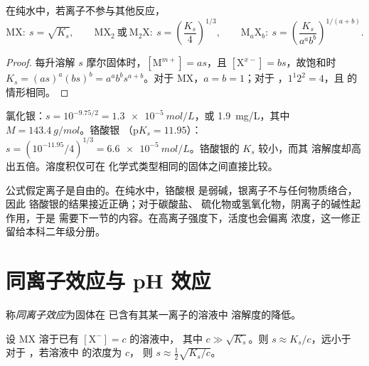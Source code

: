 \begin{proposition}[由溶度积求溶解度]\label{prop:b1:precipitation:s-of-ks}
在纯水中，若离子不参与其他反应，
\[
  \mathrm{MX}:\ s = \sqrt{K_s}, \qquad
  \mathrm{MX_2}\ \text{或}\ \mathrm{M_2X}:\ s = \left(\frac{K_s}{4}\right)^{1/3},
  \qquad
  \mathrm{M}_a\mathrm{X}_b:\ s = \left(\frac{K_s}{a^a b^b}\right)^{1/(a+b)} .
\]
\end{proposition}

\begin{proof}
每升溶解 $s$ 摩尔固体时，$[\mathrm{M}^{m+}] = as$，且
$[\mathrm{X}^{x-}] = bs$，故饱和时 $K_s = (as)^a(bs)^b =
a^a b^b s^{a+b}$。对于 MX，$a = b = 1$；对于 ，$1^1 2^2 = 4$，且
 的情形相同。
\end{proof}

\begin{example}[氯化银与铬酸银]\label{ex:b1:precipitation:agcl-ag2cro4}
氯化银：$s = 10^{-9.75/2} = \qty{1.3e-5}{mol/L}$，或
\qty{1.9}{mg/L}，其中 $M = \qty{143.4}{g/mol}$。铬酸银 
（$\mathrm{p}K_s = 11.95$）：$s = (10^{-11.95}/4)^{1/3} =
\qty{6.6e-5}{mol/L}$。铬酸银的 $K_s$ 较小，而其
溶解度却高出五倍。溶度积仅可在
化学式类型相同的固体之间直接比较。
\end{example}

\begin{remark}
公式假定离子是自由的。在纯水中，铬酸根
是弱碱，银离子不与任何物质络合，因此
铬酸银的结果接近正确；对于碳酸盐、
硫化物或氢氧化物，阴离子的碱性起作用，于是
需要下一节的内容。在高离子强度下，活度也会偏离
浓度，这一修正留给本科二年级分册。
\end{remark}

\section{同离子效应与 pH 效应}

\begin{definition}[同离子效应]\label{def:b1:precipitation:common-ion}
称\emph{同离子效应}为固体在
已含有其某一离子的溶液中
溶解度的降低。
\end{definition}

\begin{proposition}[含同离子时的溶解度]\label{prop:b1:precipitation:common-ion}
设 MX 溶于已有 $[\mathrm{X}^-] = c$ 的溶液中，
其中 $c \gg \sqrt{K_s}$。则 $s \approx K_s/c$，远小于
对于 ，若溶液中  的浓度为 $c$，
则 $s \approx \frac12\sqrt{K_s/c}$。
\end{proposition}

